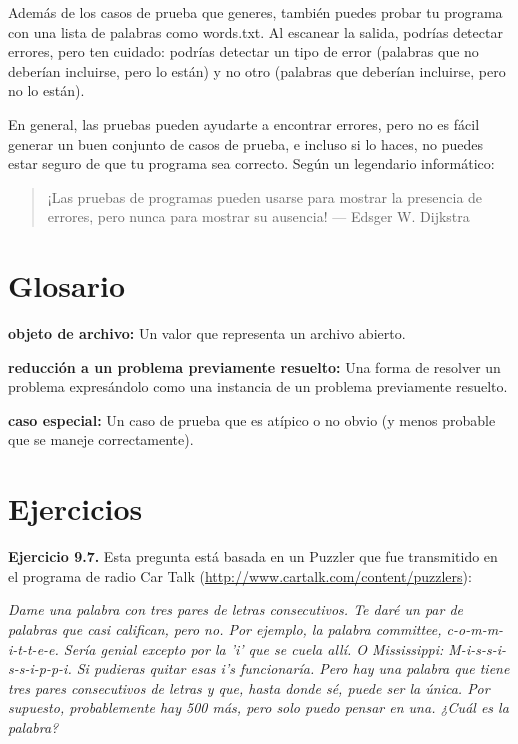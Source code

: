 Además de los casos de prueba que generes, también puedes probar tu programa con una lista de palabras como words.txt. Al escanear la salida, podrías detectar errores, pero ten cuidado: podrías detectar un tipo de error (palabras que no deberían incluirse, pero lo están) y no otro (palabras que deberían incluirse, pero no lo están).

En general, las pruebas pueden ayudarte a encontrar errores, pero no es fácil generar un buen conjunto de casos de prueba, e incluso si lo haces, no puedes estar seguro de que tu programa sea correcto. Según un legendario informático:

\begin{quote}
¡Las pruebas de programas pueden usarse para mostrar la presencia de errores, pero nunca para mostrar su ausencia!
— Edsger W. Dijkstra
\end{quote}

\section{Glosario}

\textbf{objeto de archivo:} Un valor que representa un archivo abierto.

\textbf{reducción a un problema previamente resuelto:} Una forma de resolver un problema expresándolo como una instancia de un problema previamente resuelto.

\textbf{caso especial:} Un caso de prueba que es atípico o no obvio (y menos probable que se maneje correctamente).

\section{Ejercicios}

\textbf{Ejercicio 9.7.} Esta pregunta está basada en un Puzzler que fue transmitido en el programa de radio Car Talk (\url{http://www.cartalk.com/content/puzzlers}):

\textit{Dame una palabra con tres pares de letras consecutivos. Te daré un par de palabras que casi califican, pero no. Por ejemplo, la palabra committee, c-o-m-m-i-t-t-e-e. Sería genial excepto por la 'i' que se cuela allí. O Mississippi: M-i-s-s-i-s-s-i-p-p-i. Si pudieras quitar esas i's funcionaría. Pero hay una palabra que tiene tres pares consecutivos de letras y que, hasta donde sé, puede ser la única. Por supuesto, probablemente hay 500 más, pero solo puedo pensar en una. ¿Cuál es la palabra?}

